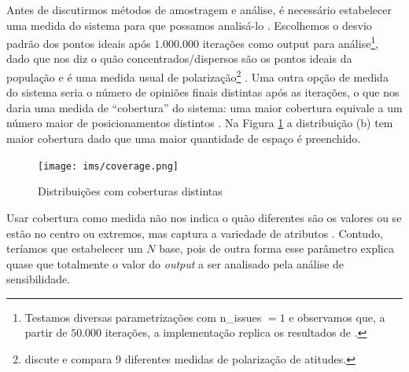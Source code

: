     Antes de discutirmos métodos de amostragem e análise, é necessário
    estabelecer uma medida do sistema para que possamos analisá-lo
    \cite{railsback2012agent}. Escolhemos o desvio padrão dos pontos ideais após
    \(1.000.000\) iterações como output para análise\footnote{Testamos diversas
      parametrizações com n\_issues \(= 1\) e observamos que, a partir de
      \(50.000\) iterações, a implementação replica os resultados de
      .}, dado que nos diz o quão
    concentrados/dispersos são os pontos ideais da população e é uma medida
    usual de polarização\footnote{ discute
      e compara 9 diferentes medidas de polarização de atitudes.}
    \cite{bramson2016disambiguation}. Uma outra opção de medida do sistema seria
    o número de opiniões finais distintas após as iterações, o que nos daria uma
    medida de ``cobertura'' do sistema: uma maior cobertura equivale a um número
    maior de posicionamentos distintos \cite{bramson2016disambiguation}. Na
    Figura \ref{fig:coverage} a distribuição (b) tem maior cobertura dado que
    uma maior quantidade de espaço é preenchido.
    
    \begin{figure}[H]
      \centering
      \caption{Distribuições com coberturas distintas}
      \texttt{[image: ims/coverage.png]}
      \label{fig:coverage}
    \end{figure}

    
    Usar cobertura como medida não nos indica o quão diferentes são os valores
    ou se estão no centro ou extremos, mas captura a variedade de atributos
    \cite[p.85]{bramson2016disambiguation}. Contudo, teríamos que estabelecer um
    \(N\) base, pois de outra forma esse parâmetro explica quase que totalmente
    o valor do \textit{output} a ser analisado pela análise de sensibilidade.
    
